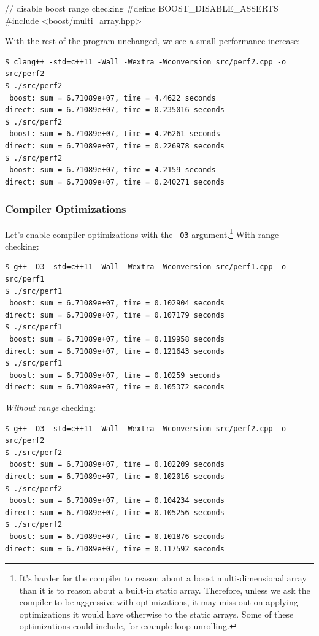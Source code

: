 \documentclass[12pt,letterpaper,twoside]{article}
\begin{document}
\begin{cpp}
// disable boost range checking
#define BOOST_DISABLE_ASSERTS
#include <boost/multi_array.hpp>
\end{cpp}

With the rest of the program unchanged, we see a small performance increase:
{\small
\begin{verbatim}
$ clang++ -std=c++11 -Wall -Wextra -Wconversion src/perf2.cpp -o src/perf2
$ ./src/perf2
 boost: sum = 6.71089e+07, time = 4.4622 seconds
direct: sum = 6.71089e+07, time = 0.235016 seconds
$ ./src/perf2
 boost: sum = 6.71089e+07, time = 4.26261 seconds
direct: sum = 6.71089e+07, time = 0.226978 seconds
$ ./src/perf2
 boost: sum = 6.71089e+07, time = 4.2159 seconds
direct: sum = 6.71089e+07, time = 0.240271 seconds
\end{verbatim}
}

\subsubsection{Compiler Optimizations}
Let's enable compiler optimizations with the \texttt{-O3} argument.\footnote{It's harder for 
the compiler to reason about a boost multi-dimensional array than it is to reason about a built-in
static array. Therefore, unless we ask the compiler to be aggressive with optimizations, it may
miss out on applying optimizations it would have otherwise to the static arrays. Some of these
optimizations could include, for example 
\href{https://en.wikipedia.org/wiki/Loop_unrolling}{loop-unrolling}.}
With range checking:

{\small
\begin{verbatim}
$ g++ -O3 -std=c++11 -Wall -Wextra -Wconversion src/perf1.cpp -o src/perf1
$ ./src/perf1
 boost: sum = 6.71089e+07, time = 0.102904 seconds
direct: sum = 6.71089e+07, time = 0.107179 seconds
$ ./src/perf1
 boost: sum = 6.71089e+07, time = 0.119958 seconds
direct: sum = 6.71089e+07, time = 0.121643 seconds
$ ./src/perf1
 boost: sum = 6.71089e+07, time = 0.10259 seconds
direct: sum = 6.71089e+07, time = 0.105372 seconds
\end{verbatim}
}

\emph{Without range} checking:
{\small
\begin{verbatim}
$ g++ -O3 -std=c++11 -Wall -Wextra -Wconversion src/perf2.cpp -o src/perf2
$ ./src/perf2
 boost: sum = 6.71089e+07, time = 0.102209 seconds
direct: sum = 6.71089e+07, time = 0.102016 seconds
$ ./src/perf2
 boost: sum = 6.71089e+07, time = 0.104234 seconds
direct: sum = 6.71089e+07, time = 0.105256 seconds
$ ./src/perf2
 boost: sum = 6.71089e+07, time = 0.101876 seconds
direct: sum = 6.71089e+07, time = 0.117592 seconds
\end{verbatim}
}
\end{document}
